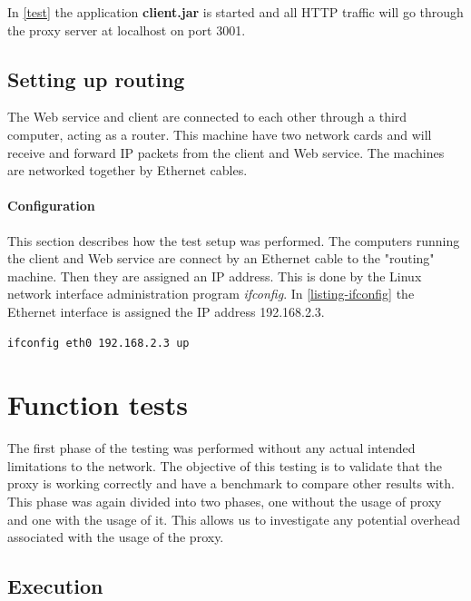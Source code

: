 In \cref{test} the application \textbf{client.jar} is started and all HTTP
traffic will go through the proxy server at localhost on port 3001.

\subsection{Setting up routing}

 The Web service and client are connected to each other through a third
 computer, acting as a router. This machine have two network cards and will
 receive and forward IP packets from the client and Web service. The machines
 are networked together by Ethernet cables.

\paragraph{Configuration}

This section describes how the test setup was performed. The computers running
the client and Web service are connect by an Ethernet cable to the "routing"
machine. Then they are assigned an IP address. This is done by the Linux network
interface administration program \textit{ifconfig}. In \cref{listing-ifconfig}
the Ethernet interface is assigned the IP address 192.168.2.3.

\begin{lstlisting}[frame=single, caption="Configuring a network interface", label=listing-ifconfig]
ifconfig eth0 192.168.2.3 up

\end{lstlisting}

\section{Function tests}

The first phase of the testing was performed without any actual intended
limitations to the network. The objective of this testing is to validate that
the proxy is working correctly and have a benchmark to compare other results
with. This phase was again divided into two phases, one without the usage of
proxy and one with the usage of it. This allows us to investigate any potential
overhead associated with the usage of the proxy.

\subsection{Execution}

